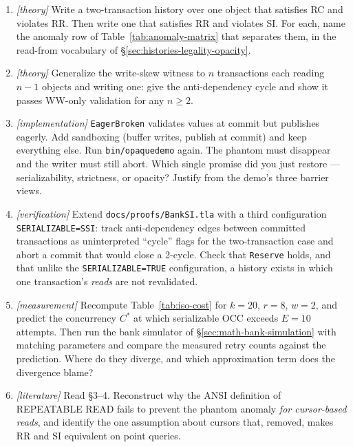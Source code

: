 \begin{enumerate}
\item \emph{[theory]} Write a two-transaction history over one object that
satisfies RC and violates RR. Then write one that satisfies RR and violates
SI. For each, name the anomaly row of Table~\ref{tab:anomaly-matrix} that
separates them, in the read-from vocabulary of \S\ref{sec:histories-legality-opacity}.

\item \emph{[theory]} Generalize the write-skew witness to $n$ transactions
each reading $n{-}1$ objects and writing one: give the anti-dependency cycle
and show it passes WW-only validation for any $n \geq 2$.

\item \emph{[implementation]} \texttt{EagerBroken} validates values at commit
but publishes eagerly. Add sandboxing (buffer writes, publish at commit) and
keep everything else. Run \texttt{bin/opaquedemo} again. The phantom must
disappear and the writer must still abort. Which single promise did you just
restore --- serializability, strictness, or opacity? Justify from the demo's
three barrier views.

\item \emph{[verification]} Extend \texttt{docs/proofs/BankSI.tla} with a
third configuration \texttt{SERIALIZABLE=SSI}: track anti-dependency edges
between committed transactions as uninterpreted ``cycle'' flags for the
two-transaction case and abort a commit that would close a 2-cycle. Check
that \texttt{Reserve} holds, and that unlike the \texttt{SERIALIZABLE=TRUE}
configuration, a history exists in which one transaction's \emph{reads} are
not revalidated.

\item \emph{[measurement]} Recompute Table~\ref{tab:iso-cost} for $k=20$,
$r=8$, $w=2$, and predict the concurrency $C^*$ at which serializable OCC
exceeds $E=10$ attempts. Then run the bank simulator of
\S\ref{sec:math-bank-simulation} with matching parameters and compare the
measured retry counts against the prediction. Where do they diverge, and
which approximation term does the divergence blame?

\item \emph{[literature]} Read \cite{berenson95critique} §3–4. Reconstruct
why the ANSI definition of REPEATABLE READ fails to prevent the phantom
anomaly \emph{for cursor-based reads}, and identify the one assumption about
cursors that, removed, makes RR and SI equivalent on point queries.


\end{enumerate}

